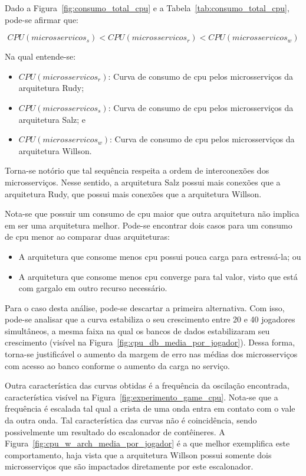Dado a Figura~\ref{fig:consumo_total_cpu} e a Tabela~\ref{tab:consumo_total_cpu}, pode-se afirmar que:

$$
    CPU(microsservicos_{s}) < CPU(microsservicos_{r}) < CPU(microsservicos_{w})
$$

Na qual entende-se:

\begin{itemize}
\item $CPU(microsservicos_{r})$: Curva de consumo de \ac{cpu} pelos microsserviços da arquitetura Rudy;
\item $CPU(microsservicos_{s})$: Curva de consumo de \ac{cpu} pelos microsserviços da arquitetura Salz; e
\item $CPU(microsservicos_{w})$: Curva de consumo de \ac{cpu} pelos microsserviços da arquitetura Willson.
\end{itemize}

Torna-se notório que tal sequência respeita a ordem de interconexões dos microsserviços.
%
Nesse sentido, a arquitetura Salz possui mais conexões que a arquitetura Rudy, que possui mais conexões que a arquitetura Willson.

Nota-se que possuir um consumo de \ac{cpu} maior que outra arquitetura não implica em ser uma arquitetura melhor.
%
Pode-se encontrar dois casos para um consumo de \ac{cpu} menor ao comparar duas arquiteturas:

\begin{itemize}
 \item A arquitetura que consome menos \ac{cpu} possui pouca carga para estressá-la; ou
 \item A arquitetura que consome menos \ac{cpu} converge para tal valor, visto que está com gargalo em outro recurso necessário.
\end{itemize}

Para o caso desta análise, pode-se descartar a primeira alternativa.
%
Com isso, pode-se analisar que a curva estabiliza o seu crescimento entre 20 e 40 jogadores simultâneos, a mesma faixa na qual os bancos de dados estabilizaram seu crescimento (visível na Figura~\ref{fig:cpu_db_media_por_jogador}).
%
Dessa forma, torna-se justificável o aumento da margem de erro nas médias dos microsserviços com acesso ao banco conforme o aumento da carga no serviço.

Outra característica das curvas obtidas é a frequência da oscilação encontrada, característica visível na Figura~\ref{fig:experimento_game_cpu}.
%
Nota-se que a frequência é escalada tal qual a crista de uma onda entra em contato com o vale da outra onda.
%
Tal característica das curvas não é coincidência, sendo possivelmente um resultado do escalonador de contêineres.
%
A Figura~\ref{fig:cpu_w_arch_media_por_jogador} é a que melhor exemplifica este comportamento, haja vista que a arquitetura Willson possui somente dois microsserviços que são impactados diretamente por este escalonador.


